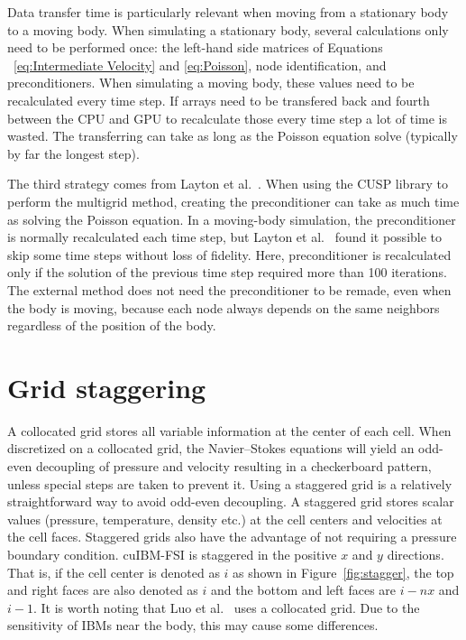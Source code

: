 Data transfer time is particularly relevant when moving from a stationary body to a moving body.
When simulating a stationary body, several calculations only need to be performed once: the left-hand side matrices of Equations ~\eqref{eq:Intermediate Velocity} and \eqref{eq:Poisson}, node identification, and preconditioners. 
When simulating a moving body, these values need to be recalculated every time step. 
If arrays need to be transfered back and fourth between the CPU and GPU to recalculate those every time step a lot of time is wasted.
The transferring can take as long as the Poisson equation solve (typically by far the longest step). 

The third strategy comes from Layton et al.~\cite{layton2011cuibm}.
When using the CUSP library to perform the multigrid method, creating the preconditioner can take as much time as solving the Poisson equation.
In a moving-body simulation, the preconditioner is normally recalculated each time step, but Layton et al.~\cite{layton2011cuibm} found it possible to skip some time steps without loss of fidelity.
Here, preconditioner is recalculated only if the solution of the previous time step required more than 100 iterations. 
The external method does not need the preconditioner to be remade, even when the body is moving, because each node always depends on the same neighbors regardless of the position of the body. 


\section{Grid staggering}
\label{Grid Staggering}

A collocated grid stores all variable information at the center of each cell.
When discretized on a collocated grid, the Navier--Stokes equations will yield an odd-even decoupling of pressure and velocity resulting in a checkerboard pattern, unless special steps are taken to prevent it. 
Using a staggered grid is a relatively straightforward way to avoid odd-even decoupling. 
A staggered grid stores scalar values (pressure, temperature, density etc.) at the cell centers and velocities at the cell faces. 
Staggered grids also have the advantage of not requiring a pressure boundary condition. 
cuIBM-FSI is staggered in the positive $x$ and $y$ directions. 
That is, if the cell center is denoted as $i$ as shown in Figure~\ref{fig:stagger}, the top and right faces are also denoted as $i$ and the bottom and left faces are $i-nx$ and $i-1$. 
It is worth noting that Luo et al.~\cite{Luo:2012gx} uses a collocated grid. 
Due to the sensitivity of IBMs near the body, this may cause some differences. 

